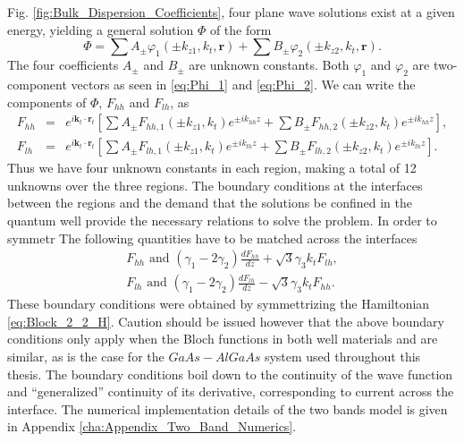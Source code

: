  Fig. \ref{fig:Bulk_Dispersion_Coefficients}, four plane wave solutions
exist at a given energy, yielding a general solution $\Phi$ of the
form\begin{equation}
\Phi=\sum A_{\pm}\varphi_{1}(\pm k_{z1},k_{t},\mathbf{r})+\sum B_{\pm}\varphi_{2}(\pm k_{z2},k_{t},\mathbf{r}).\end{equation}
The four coefficients $A_{\pm}$ and $B_{\pm}$ are unknown constants.
Both $\varphi_{1}$ and $\varphi_{2}$ are two-component vectors as
seen in \ref{eq:Phi_1} and \ref{eq:Phi_2}. We can write the components
of $\Phi$, $F_{hh}$ and $F_{lh}$, as \begin{eqnarray}
F_{hh} & = & e^{i\mathbf{k}_{t}\cdot\mathbf{r}_{t}}\left[\sum A_{\pm}F_{hh,1}(\pm k_{z1},k_{t})e^{\pm ik_{hh}z}+\sum B_{\pm}F_{hh,2}(\pm k_{z2},k_{t})e^{\pm ik_{hh}z}\right],\\
F_{lh} & = & e^{i\mathbf{k}_{t}\cdot\mathbf{r}_{t}}\left[\sum A_{\pm}F_{lh,1}(\pm k_{z1},k_{t})e^{\pm ik_{lh}z}+\sum B_{\pm}F_{lh,2}(\pm k_{z2},k_{t})e^{\pm ik_{lh}z}\right].\end{eqnarray}
Thus we have four unknown constants in each region, making a total
of 12 unknowns over the three regions. The boundary conditions at
the interfaces between the regions and the demand that the solutions
be confined in the quantum well provide the necessary relations to
solve the problem. In order to symmetr The following quantities have
to be matched across the interfaces\begin{eqnarray}
F_{hh}\,\,\textrm{and}\,\,\left(\gamma_{1}-2\gamma_{2}\right)\frac{dF_{hh}}{dz}+\sqrt{3}\gamma_{3}k_{t}F_{lh},\\
F_{lh}\,\,\textrm{and}\,\,\left(\gamma_{1}-2\gamma_{2}\right)\frac{dF_{lh}}{dz}-\sqrt{3}\gamma_{3}k_{t}F_{hh}.\end{eqnarray}
These boundary conditions were obtained by symmettrizing the Hamiltonian
\ref{eq:Block_2_2_H}. Caution should be issued however that the above
boundary conditions only apply when the Bloch functions in both well
materials and are similar, as is the case for the $GaAs-AlGaAs$ system
used throughout this thesis. The boundary conditions boil down to
the continuity of the wave function and {}``generalized'' continuity
of its derivative, corresponding to current across the interface.
The numerical implementation details of the two bands model is given
in Appendix \ref{cha:Appendix_Two_Band_Numerics}. %
